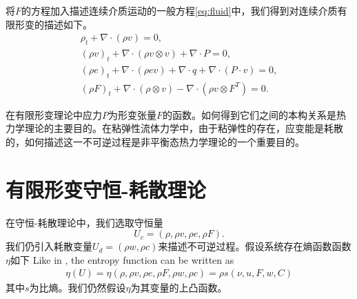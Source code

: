\documentclass{article}
\begin{document}
将$F$的方程加入描述连续介质运动的一般方程\eqref{eq:fluid}中，我们得到对连续介质有限形变的描述如下。
\begin{subequations}\label{eq:continuum}
\begin{align}
\rho_t + \nabla \cdot (\rho v )=0, \\
(\rho v)_t + \nabla \cdot (\rho v \otimes v) + \nabla \cdot P = 0, \\
(\rho e)_t + \nabla \cdot (\rho e v) + \nabla \cdot q + \nabla \cdot (P \cdot v) = 0 ,\\
(\rho F)_t + \nabla \cdot (\rho \otimes v) - \nabla \cdot (\rho v \otimes F^T) = 0 .
\end{align}
\end{subequations}

在有限形变理论中应力$P$为形变张量$F$的函数。如何得到它们之间的本构关系是热力学理论的主要目的。在粘弹性流体力学中，由于粘弹性的存在，应变能是耗散的，如何描述这一不可逆过程是非平衡态热力学理论的一个重要目的。

\section{有限形变守恒-耗散理论}
在守恒-耗散理论中，我们选取守恒量
$$U_c = (\rho, \rho v, \rho e, \rho F).$$
我们仍引入耗散变量$U_d = (\rho w,\rho c)$来描述不可逆过程。假设系统存在熵函数函数$\eta$如下
Like in \cite{zhu2015conservation}, the entropy function can be written as
\begin{eqnarray*}
\eta(U) = \eta(\rho, \rho v, \rho e,\rho F,\rho w, \rho c) = \rho s(\nu,u,F,w,C)
\end{eqnarray*}
其中$s$为比熵。我们仍然假设$\eta$为其变量的上凸函数。
\end{document}
